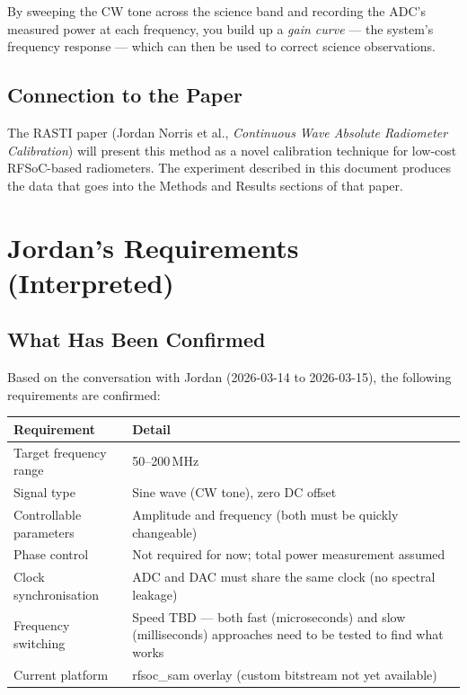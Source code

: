 \documentclass[11pt,a4paper]{article}
\begin{document}
By sweeping the CW tone across the science band and recording the ADC's measured
power at each frequency, you build up a \textit{gain curve} --- the system's frequency
response --- which can then be used to correct science observations.

\subsection{Connection to the Paper}

The RASTI paper (Jordan Norris et al., \textit{Continuous Wave Absolute Radiometer
Calibration}) will present this method as a novel calibration technique for low-cost
RFSoC-based radiometers. The experiment described in this document produces the
data that goes into the Methods and Results sections of that paper.

\section{Jordan's Requirements (Interpreted)}

\subsection{What Has Been Confirmed}

Based on the conversation with Jordan (2026-03-14 to 2026-03-15), the following
requirements are confirmed:

\begin{center}
\begin{tabular}{L{4cm} L{9.5cm}}
\toprule
\textbf{Requirement} & \textbf{Detail} \\
\midrule
Target frequency range & 50--200\,MHz \\
Signal type            & Sine wave (CW tone), zero DC offset \\
Controllable parameters & Amplitude and frequency (both must be quickly changeable) \\
Phase control          & Not required for now; total power measurement assumed \\
Clock synchronisation  & ADC and DAC must share the same clock (no spectral leakage) \\
Frequency switching    & Speed TBD --- both fast (microseconds) and slow (milliseconds)
                          approaches need to be tested to find what works \\
Current platform       & rfsoc\_sam overlay (custom bitstream not yet available) \\
\bottomrule
\end{tabular}
\end{center}
\end{document}
